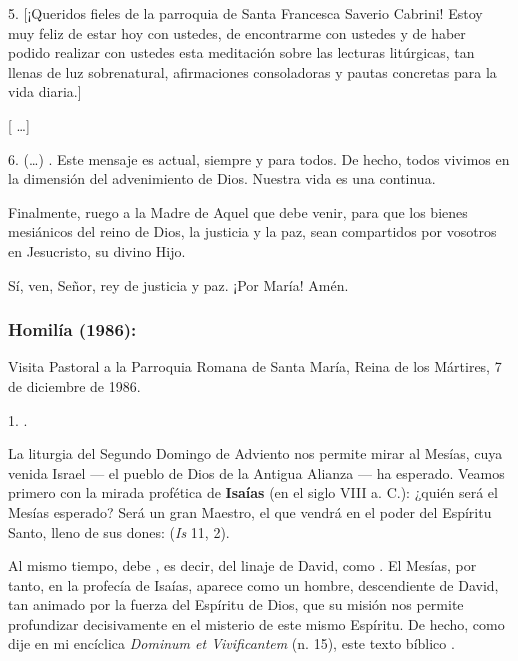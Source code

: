 \begin{body}
\begin{body}
	5. {[}¡Queridos fieles de la parroquia de Santa Francesca Saverio Cabrini! Estoy muy feliz de estar hoy con ustedes, de encontrarme con ustedes y de haber podido realizar con ustedes esta meditación sobre las lecturas litúrgicas, tan llenas de luz sobrenatural, afirmaciones consoladoras y pautas concretas para la vida diaria.{]}
	
	{[} \ldots{}{]}
	
	6. (\ldots{}) . Este mensaje es actual, siempre y para todos. De hecho, todos vivimos en la dimensión del advenimiento de Dios. Nuestra vida es una  continua.
	
	Finalmente, ruego a la Madre de Aquel que debe venir, para que los bienes mesiánicos del reino de Dios, la justicia y la paz, sean compartidos por vosotros en Jesucristo, su divino Hijo.
	
	Sí, ven, Señor, rey de justicia y paz. ¡Por María! Amén.
\end{body}

\subsubsection{Homilía (1986):}

Visita Pastoral a la Parroquia Romana de Santa María, Reina de los Mártires, 7 de diciembre de 1986.

\begin{body}
	1. .
	
	La liturgia del Segundo Domingo de Adviento nos permite mirar al Mesías, cuya venida Israel --- el pueblo de Dios de la Antigua Alianza --- ha esperado. Veamos primero con la mirada profética de \textbf{Isaías} (en el siglo VIII a. C.): ¿quién será el Mesías esperado? Será un gran Maestro, el que vendrá en el poder del Espíritu Santo, lleno de sus dones:  (\emph{Is} 11, 2).
	
	Al mismo tiempo, debe , es decir, del linaje de David, como . El Mesías, por tanto, en la profecía de Isaías, aparece como un hombre, descendiente de David, tan animado por la fuerza del Espíritu de Dios, que su misión nos permite profundizar decisivamente en el misterio de este mismo Espíritu. De hecho, como dije en mi encíclica \emph{Dominum et Vivificantem} (n. 15), este texto bíblico .
	

\end{body}
\end{body}
